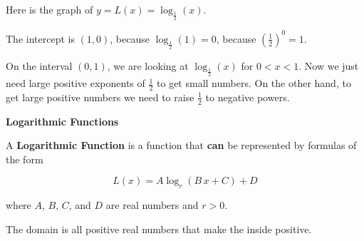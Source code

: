 \documentclass{ximera}
\begin{document}
\begin{example}

Here is the graph of $y = L(x) = \log_{\tfrac{1}{2}}(x)$.

\begin{image}
\end{image}


The intercept is $(1,0)$, because $\log_{\tfrac{1}{2}}(1) = 0$, because $\left(\frac{1}{2}\right)^0 = 1$.

On the interval $(0,1)$, we are looking at $\log_{\tfrac{1}{2}}(x)$ for $0<x<1$.  Now we just need large positive exponents of $\frac{1}{2}$ to get small numbers.  On the other hand, to get large positive numbers we need to raise $\frac{1}{2}$ to negative powers.





\end{example}











\begin{definition} \textbf{\textcolor{green!50!black}{Logarithmic Functions}}

A \textbf{Logarithmic Function} is a function that \textbf{\textcolor{purple!85!blue}{can}} be represented by formulas of the form

\[     L(x) =    A \log_r(B \, x + C) + D            \]

where $A$, $B$, $C$, and $D$ are real numbers and $r > 0$.

The domain is all positive real numbers that make the inside positive.

\end{definition}
\end{document}
